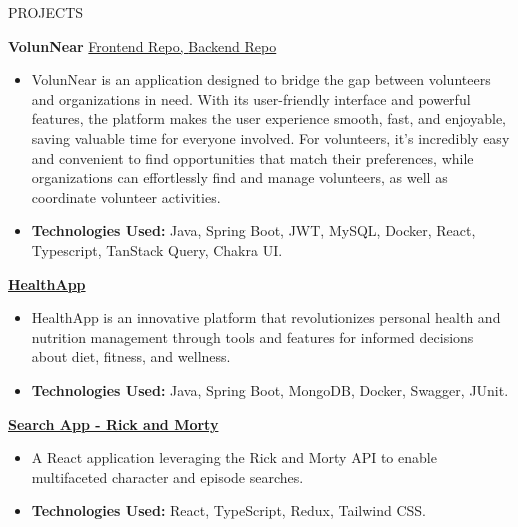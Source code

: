 \documentclass{resume}
\begin{document}


\begin{rSection}{PROJECTS}

\textbf{VolunNear} 
\href{https://github.com/Asnvir/VolunNear-frontend}{Frontend Repo, } 
\href{https://github.com/Asnvir/VolunNear-backend}{Backend Repo}
\begin{itemize}
    \item VolunNear is an application designed to bridge the gap between volunteers and organizations in need. With its user-friendly interface and powerful features, the platform makes the user experience smooth, fast, and enjoyable, saving valuable time for everyone involved. For volunteers, it’s incredibly easy and convenient to find opportunities that match their preferences, while organizations can effortlessly find and manage volunteers, as well as coordinate volunteer activities.
    \item \textbf{Technologies Used:} Java, Spring Boot, JWT, MySQL, Docker, React, Typescript, TanStack Query, Chakra UI.
\end{itemize}

\vspace{0.25em}

\textbf{\href{https://github.com/Asnvir/HealthApp}{HealthApp}}

\begin{itemize}
    \item HealthApp is an innovative platform that revolutionizes personal health and nutrition management through tools and features for informed decisions about diet, fitness, and wellness.
    \item \textbf{Technologies Used:} Java, Spring Boot, MongoDB, Docker, Swagger, JUnit.
\end{itemize}

\vspace{0.25em}

\textbf{\href{https://github.com/Asnvir/React-TS-RickMorty}{Search App - Rick and Morty}}

\begin{itemize}
    \item A React application leveraging the Rick and Morty API to enable multifaceted character and episode searches.
    \item \textbf{Technologies Used:} React, TypeScript, Redux, Tailwind CSS.
\end{itemize}

\end{rSection}
\end{document}
